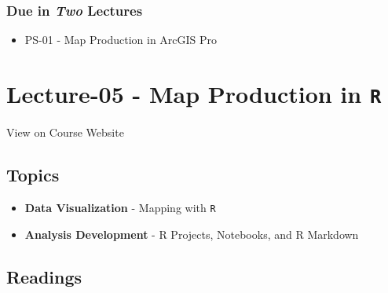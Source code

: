 \documentclass[]{book}
\providecommand{\tightlist}{%
  \setlength{\itemsep}{0pt}\setlength{\parskip}{0pt}}
\begin{document}
\hypertarget{due-in-two-lectures}{%
\subsubsection*{\texorpdfstring{Due in \emph{Two} Lectures}{Due in Two Lectures}}\label{due-in-two-lectures}}

\begin{itemize}
\tightlist
\item
  PS-01 - Map Production in ArcGIS Pro
\end{itemize}

\hypertarget{lecture-05---map-production-in-r}{%
\section*{\texorpdfstring{Lecture-05 - Map Production in \texttt{R}}{Lecture-05 - Map Production in R}}\label{lecture-05---map-production-in-r}}

View on Course Website

\hypertarget{topics-5}{%
\subsection*{Topics}\label{topics-5}}

\begin{itemize}
\tightlist
\item
  \textbf{Data Visualization} - Mapping with \texttt{R}
\item
  \textbf{Analysis Development} - R Projects, Notebooks, and R Markdown
\end{itemize}

\hypertarget{readings-6}{%
\subsection*{Readings}\label{readings-6}}
\end{document}
